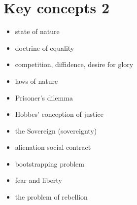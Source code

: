 \section{Key concepts 2}

\begin{itemize}
	\item state of nature
	\item doctrine of equality
	\item competition, diffidence, desire for glory
	\item laws of nature
	\item Prisoner’s dilemma
	\item Hobbes’ conception of justice
	\item the Sovereign (sovereignty)
	\item alienation social contract
	\item bootstrapping problem
	\item fear and liberty
	\item the problem of rebellion
\end{itemize}
